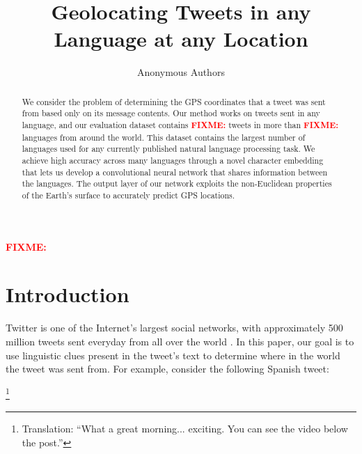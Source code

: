 \documentclass[sigconf,10pt]{acmart}
\title{Geolocating Tweets in any Language at any Location}
\author{Anonymous Authors}
\affiliation{}
\newcommand{\fixme}[1]{\textcolor{red}{\textbf{FIXME:} {#1}}}
\begin{document}
\begin{abstract}
    We consider the problem of determining the GPS coordinates that a tweet was sent from based only on its message contents.
    Our method works on tweets sent in any language,
    and our evaluation dataset contains \fixme{} tweets in more than \fixme{} languages from around the world.
    This dataset contains the largest number of languages used for any currently published natural language processing task.
    We achieve high accuracy across many languages through a novel character embedding that lets us develop a convolutional neural network that shares information between the languages.
    The output layer of our network exploits the non-Euclidean properties of the Earth's surface to accurately predict GPS locations.
\end{abstract}

%
%
\begin{CCSXML}
    \fixme{}
\end{CCSXML}



\keywords{\fixme{}}

\maketitle


\section{Introduction}

Twitter is one of the Internet's largest social networks,
with approximately 500 million tweets sent everyday from all over the world \citep{}.
In this paper, our goal is to use linguistic clues present in the tweet's text to determine where in the world the tweet was sent from.
For example, consider the following Spanish tweet:

\noindent
{}%
\footnote{Translation: ``What a great morning... exciting.  You can see the video below the post.''}
\end{document}
